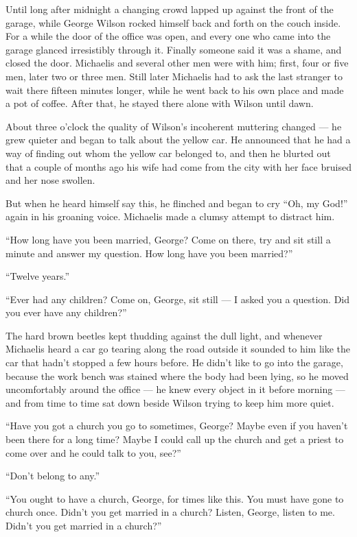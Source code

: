 \documentclass{znotebook}
\begin{document}
Until long after midnight a changing crowd lapped up against the front of the garage, while George Wilson rocked himself back and forth on the couch inside. For a while the door of the office was open, and every one who came into the garage glanced irresistibly through it. Finally someone said it was a shame, and closed the door. Michaelis and several other men were with him; first, four or five men, later two or three men. Still later Michaelis had to ask the last stranger to wait there fifteen minutes longer, while he went back to his own place and made a pot of coffee. After that, he stayed there alone with Wilson until dawn.

About three o'clock the quality of Wilson's incoherent muttering changed ---{} he grew quieter and began to talk about the yellow car. He announced that he had a way of finding out whom the yellow car belonged to, and then he blurted out that a couple of months ago his wife had come from the city with her face bruised and her nose swollen.

But when he heard himself say this, he flinched and began to cry ``Oh, my God!'' again in his groaning voice. Michaelis made a clumsy attempt to distract him.

``How long have you been married, George? Come on there, try and sit still a minute and answer my question. How long have you been married?''

``Twelve years.''

``Ever had any children? Come on, George, sit still ---{} I asked you a question. Did you ever have any children?''

The hard brown beetles kept thudding against the dull light, and whenever Michaelis heard a car go tearing along the road outside it sounded to him like the car that hadn't stopped a few hours before. He didn't like to go into the garage, because the work bench was stained where the body had been lying, so he moved uncomfortably around the office ---{} he knew every object in it before morning ---{} and from time to time sat down beside Wilson trying to keep him more quiet.

``Have you got a church you go to sometimes, George? Maybe even if you haven't been there for a long time? Maybe I could call up the church and get a priest to come over and he could talk to you, see?''

``Don't belong to any.''

``You ought to have a church, George, for times like this. You must have gone to church once. Didn't you get married in a church? Listen, George, listen to me. Didn't you get married in a church?''
\end{document}
